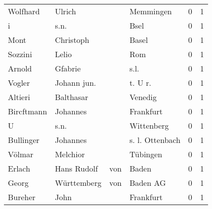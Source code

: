 \begin{center}
\begin{tiny}
\begin{longtabu}{llllrr}
                 Wolfhard &                             Ulrich &             &                                   Memmingen &          0 &         1 \\
                        i &                               s.n. &             &                                        Bsel &          0 &         1 \\
                     Mont &                          Christoph &             &                                       Basel &          0 &         1 \\
                  Sozzini &                              Lelio &             &                                         Rom &          0 &         1 \\
                   Arnold &                            Gfabrie &             &                                        s.l. &          0 &         1 \\
                   Vogler &                        Johann jun. &             &                                    t. U r.  &          0 &         1 \\
                  Altieri &                          Balthasar &             &                                     Venedig &          0 &         1 \\
               Bircftmann &                           Johannes &             &                                   Frankfurt &          0 &         1 \\
                        U &                               s.n. &             &                                  Wittenberg &          0 &         1 \\
                Bullinger &                           Johannes &             &                             s. l. Ottenbach &          0 &         1 \\
                   Völmar &                           Melchior &             &                                    Tübingen &          0 &         1 \\
                   Erlach &                        Hans Rudolf &         von &                                       Baden &          0 &         1 \\
                    Georg &                        Württemberg &         von &                                    Baden AG &          0 &         1 \\
                  Bureher &                               John &             &                                   Frankfurt &          0 &         1 \\

\end{longtabu}
\end{tiny}
\end{center}
